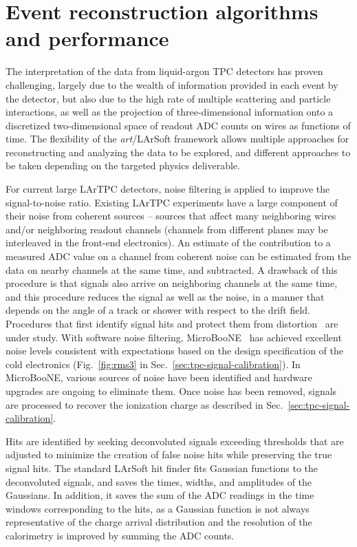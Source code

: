 \section{Event reconstruction algorithms and performance}
\label{sec:larsoftreco}

The interpretation of the data from liquid-argon TPC detectors has
proven challenging, largely due to the wealth of information provided
in each event by the detector, but also due to the high rate of
multiple scattering and particle interactions, as well as the
projection of three-dimensional information onto a discretized
two-dimensional space of readout ADC counts on wires as functions of
time.  The flexibility of the {\textit{art}}/LArSoft framework allows
multiple approaches for reconstructing and analyzing the data to be
explored, and different approaches to be taken depending on the targeted
physics deliverable.


For current large LArTPC detectors, noise filtering is applied to improve
the signal-to-noise ratio.  Existing LArTPC experiments have a
large component of their noise from coherent sources -- sources that
affect many neighboring wires and/or neighboring readout channels
(channels from different planes may be interleaved in the front-end
electronics).  An estimate of the contribution to a measured ADC value on a channel from
coherent noise can be estimated from the data on nearby channels at the same time, and subtracted.
A drawback of this procedure is that signals also arrive on neighboring
channels at the same time, and this procedure reduces the signal as
well as the noise, in a manner that depends on the angle of a track or
shower with respect to the drift field.  Procedures that first
identify signal hits and protect them from distortion~\cite{microboone_noise} 
are under study. With software noise filtering, MicroBooNE~\cite{noise_filter}
has achieved excellent noise levels consistent with expectations based on 
the design specification of the cold electronics (Fig.~\ref{fig:rms3} 
in Sec.~\ref{sec:tpc-signal-calibration}).  In MicroBooNE, various 
sources of noise have been identified and hardware upgrades 
are ongoing to eliminate them.   Once noise has been removed,
signals are processed to recover the ionization charge
as described in Sec.~\ref{sec:tpc-signal-calibration}. 

Hits are identified by seeking deconvoluted signals exceeding
thresholds that are adjusted to minimize the creation of false noise
hits while preserving the true signal hits.  The standard LArSoft hit
finder fits Gaussian functions to the deconvoluted signals, and saves the
times, widths, and amplitudes of the Gaussians.  In addition, it saves the sum of
the ADC readings in the time windows corresponding to the hits, as a
Gaussian function is not always representative of the charge arrival
distribution and the resolution of the calorimetry is improved by
summing the ADC counts.

